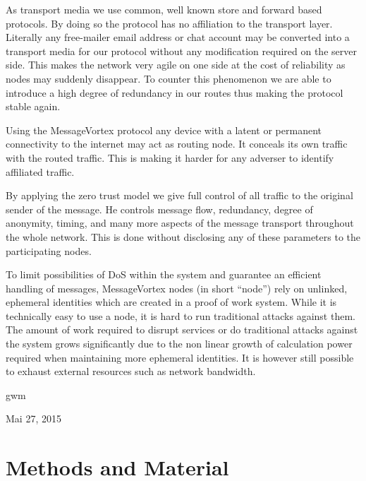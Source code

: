 \documentclass[9pt,journal,compsoc]{IEEEtran}
\begin{document}
As transport media we use common, well known store and forward based protocols. By doing so the protocol has no affiliation to the transport layer. Literally any free-mailer email address or chat account may be converted into a transport media for our protocol without any modification required on the server side. This makes the network very agile on one side at the cost of reliability as nodes may suddenly disappear. To counter this phenomenon we are able to introduce a high degree of redundancy in our routes thus making the protocol stable again.

Using the MessageVortex protocol any device with a latent or permanent connectivity to the internet may act as routing node. It conceals its own traffic with the routed traffic. This is making it harder for any adverser to identify affiliated traffic. 

By applying the zero trust model we give full control of all traffic to the original sender of the message. He controls message flow, redundancy, degree of anonymity, timing, and many more aspects of the message transport throughout the whole network. This is done without disclosing any of these parameters to the participating nodes.

To limit possibilities of DoS within the system and guarantee an efficient handling of messages, MessageVortex nodes (in short ``node'') rely on unlinked, ephemeral identities which are created in a proof of work system. While it is technically easy to use a node, it is hard to run traditional attacks against them. The amount of work required to disrupt services or do traditional attacks against the system grows significantly due to the non linear growth of calculation power required when maintaining more ephemeral identities. It is however still possible to exhaust external resources such as network bandwidth.\par\nopagebreak
\ifCLASSOPTIONpeerreview
\else
\hfill gwm\par\nopagebreak
\hfill Mai 27, 2015
\fi

\section{Methods and Material}
\end{document}
